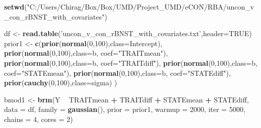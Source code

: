 \documentclass[
]{article}
\newenvironment{Shaded}{\begin{snugshade}}{\end{snugshade}}
\newcommand{\DataTypeTok}[1]{\textcolor[rgb]{0.13,0.29,0.53}{#1}}
\newcommand{\DecValTok}[1]{\textcolor[rgb]{0.00,0.00,0.81}{#1}}
\newcommand{\KeywordTok}[1]{\textcolor[rgb]{0.13,0.29,0.53}{\textbf{#1}}}
\newcommand{\NormalTok}[1]{#1}
\newcommand{\OperatorTok}[1]{\textcolor[rgb]{0.81,0.36,0.00}{\textbf{#1}}}
\newcommand{\OtherTok}[1]{\textcolor[rgb]{0.56,0.35,0.01}{#1}}
\newcommand{\StringTok}[1]{\textcolor[rgb]{0.31,0.60,0.02}{#1}}
\begin{document}
\begin{Shaded}
\begin{Highlighting}[]
\KeywordTok{setwd}\NormalTok{(}\StringTok{"C:/Users/Chirag/Box/Box/UMD/Project_UMD/eCON/RBA/uncon_v_con_rBNST_with_covariates"}\NormalTok{)}

\NormalTok{df <-}\StringTok{ }\KeywordTok{read.table}\NormalTok{(}\StringTok{'uncon_v_con_rBNST_with_covariates.txt'}\NormalTok{,}\DataTypeTok{header=}\OtherTok{TRUE}\NormalTok{)}
\NormalTok{prior1 <-}\StringTok{ }\KeywordTok{c}\NormalTok{(}\KeywordTok{prior}\NormalTok{(}\KeywordTok{normal}\NormalTok{(}\DecValTok{0}\NormalTok{,}\DecValTok{100}\NormalTok{),}\DataTypeTok{class=}\NormalTok{Intercept),}
            \KeywordTok{prior}\NormalTok{(}\KeywordTok{normal}\NormalTok{(}\DecValTok{0}\NormalTok{,}\DecValTok{100}\NormalTok{),}\DataTypeTok{class=}\NormalTok{b, }\DataTypeTok{coef=}\StringTok{"TRAITmean"}\NormalTok{),}
            \KeywordTok{prior}\NormalTok{(}\KeywordTok{normal}\NormalTok{(}\DecValTok{0}\NormalTok{,}\DecValTok{100}\NormalTok{),}\DataTypeTok{class=}\NormalTok{b, }\DataTypeTok{coef=}\StringTok{"TRAITdiff"}\NormalTok{),}
            \KeywordTok{prior}\NormalTok{(}\KeywordTok{normal}\NormalTok{(}\DecValTok{0}\NormalTok{,}\DecValTok{100}\NormalTok{),}\DataTypeTok{class=}\NormalTok{b, }\DataTypeTok{coef=}\StringTok{"STATEmean"}\NormalTok{),}
            \KeywordTok{prior}\NormalTok{(}\KeywordTok{normal}\NormalTok{(}\DecValTok{0}\NormalTok{,}\DecValTok{100}\NormalTok{),}\DataTypeTok{class=}\NormalTok{b, }\DataTypeTok{coef=}\StringTok{"STATEdiff"}\NormalTok{),}
            \KeywordTok{prior}\NormalTok{(}\KeywordTok{cauchy}\NormalTok{(}\DecValTok{0}\NormalTok{,}\DecValTok{100}\NormalTok{),}\DataTypeTok{class=}\NormalTok{sigma)}
\NormalTok{           )}

\NormalTok{bmod1 <-}\StringTok{ }\KeywordTok{brm}\NormalTok{(Y }\OperatorTok{~}\StringTok{ }\NormalTok{TRAITmean }\OperatorTok{+}\StringTok{ }\NormalTok{TRAITdiff }\OperatorTok{+}\StringTok{ }\NormalTok{STATEmean }\OperatorTok{+}\StringTok{ }\NormalTok{STATEdiff, }
             \DataTypeTok{data =}\NormalTok{ df, }
             \DataTypeTok{family =} \KeywordTok{gaussian}\NormalTok{(),}
             \DataTypeTok{prior =}\NormalTok{ prior1, }
             \DataTypeTok{warmup =} \DecValTok{2000}\NormalTok{, }\DataTypeTok{iter =} \DecValTok{5000}\NormalTok{,}
             \DataTypeTok{chains =} \DecValTok{4}\NormalTok{,}
             \DataTypeTok{cores  =} \DecValTok{2}\NormalTok{)}
\end{Highlighting}
\end{Shaded}
\end{document}
